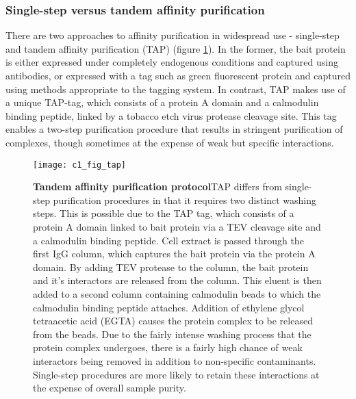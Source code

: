 \documentclass[a4paper,11pt,twoside,openright]{scrbook}
\begin{document}
\subsubsection{Single-step versus tandem affinity purification}
There are two approaches to affinity purification in widespread use - single-step and tandem affinity purification \cite{Rigaut1999} (TAP) (figure \ref{figure:tap}). In the former, the bait protein is either expressed under completely endogenous conditions and captured using antibodies, or expressed with a tag such as green fluorescent protein \cite{Hubner2010} and captured using methods appropriate to the tagging system. In contrast, TAP makes use of a unique TAP-tag, which consists of a protein A domain and a calmodulin binding peptide, linked by a tobacco etch virus protease cleavage site. This tag enables a two-step purification procedure that results in stringent purification of complexes, though sometimes at the expense of weak but specific interactions.

\begin{figure}[h]
\fcapsideright
    {\caption[Tandem affinity purification protocol]{\sffamily\textbf{Tandem affinity \newline purification protocol}\newline \small TAP differs from single-step purification procedures in that it requires two distinct washing steps. This is possible due to the TAP tag, which consists of a protein A domain linked to bait protein via a TEV cleavage site and a calmodulin binding peptide. Cell extract is passed through the first IgG column, which captures the bait protein via the protein A domain. By adding TEV protease to the column, the bait protein and it's interactors are released from the column. This eluent is then added to a second column containing calmodulin beads to which the calmodulin  binding peptide attaches. Addition of ethylene glycol tetraacetic acid (EGTA) causes the protein complex to be released from the beads. Due to the fairly intense washing process that the protein complex undergoes, there is a fairly high chance of weak interactors being removed in addition to non-specific contaminants. Single-step procedures are more likely to retain these interactions at the expense of overall sample purity.}\label{figure:tap}}
    {\texttt{[image: c1\_fig\_tap]}}
\end{figure}
\end{document}
